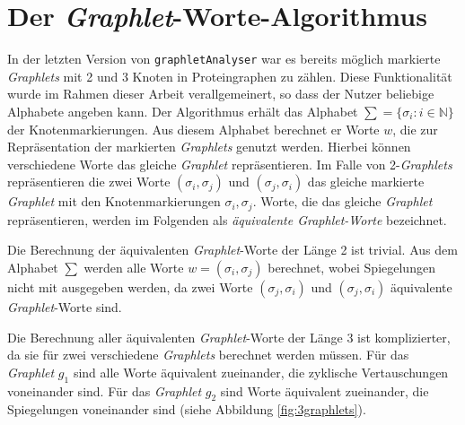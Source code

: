 \documentclass{report}
\begin{document}
\section{Der \textit{Graphlet}-Worte-Algorithmus}

In der letzten Version von \texttt{graphletAnalyser} war es bereits m\"oglich markierte \textit{Graphlets} mit 2 und 3 Knoten in Proteingraphen zu z\"ahlen. Diese Funktionalit\"at wurde im Rahmen dieser Arbeit verallgemeinert, so dass der Nutzer beliebige Alphabete angeben kann.
Der Algorithmus erh\"alt das Alphabet $\sum = \{ \sigma_i : i \in \mathbb{N} \}$ der Knotenmarkierungen. Aus diesem Alphabet berechnet er Worte $w$, die zur Repr\"asentation der markierten \textit{Graphlets} genutzt werden.
Hierbei k\"onnen verschiedene Worte das gleiche \textit{Graphlet} repr\"asentieren. Im Falle von 2-\textit{Graphlets} repr\"asentieren die zwei Worte $(\sigma_i,\sigma_j)$ und $(\sigma_j, \sigma_i)$ das gleiche markierte \textit{Graphlet} mit den Knotenmarkierungen $\sigma_i,\sigma_j$. Worte, die das gleiche \textit{Graphlet} repr\"asentieren, werden im Folgenden als \emph{\"aquivalente Graphlet-Worte}  bezeichnet.


Die Berechnung der \"aquivalenten \textit{Graphlet}-Worte der L\"ange 2 ist trivial. Aus dem Alphabet $\sum$ werden alle Worte $w = (\sigma_i, \sigma_j)$ berechnet, wobei Spiegelungen nicht mit ausgegeben werden, da zwei Worte $ (\sigma_j, \sigma_i) $ und $ (\sigma_j, \sigma_i) $ \"aquivalente \textit{Graphlet}-Worte sind.

Die Berechnung aller \"aquivalenten \textit{Graphlet}-Worte der L\"ange 3 ist komplizierter, da sie f\"ur zwei verschiedene \textit{Graphlets} berechnet werden m\"ussen. F\"ur das \textit{Graphlet} $g_1$ sind alle Worte \"aquivalent zueinander, die zyklische Vertauschungen voneinander sind. F\"ur das \textit{Graphlet} $g_2$ sind Worte \"aquivalent zueinander, die Spiegelungen voneinander sind (siehe Abbildung \ref{fig:3graphlets}). \\
\end{document}
